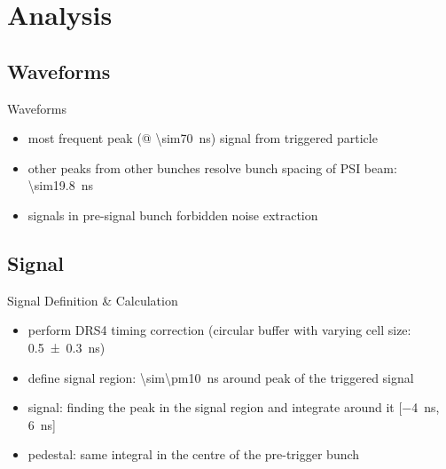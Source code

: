 \section{Analysis}
\subsection{Waveforms}
\begin{frame}{Waveforms}

	\vspace*{-20pt}
	\vspace*{-20pt}
	\vspace*{-10pt}

	\begin{itemize}\itemfill
		\item most frequent peak (@ \SI{\sim70}{ns}) \ra signal from triggered particle
		\item other peaks from other bunches \ra resolve bunch spacing of PSI beam: \SI{\sim19.8}{ns}
		\item signals in pre-signal bunch forbidden \ra noise extraction
	\end{itemize}
	
\end{frame}
\subsection{Signal}
\begin{frame}{Signal Definition \& Calculation}
 
	\vspace*{-10pt}
	
	\begin{itemize}\itemfill
		\item perform DRS4 timing correction (circular buffer with varying cell size: \SI{.5\pm.3}{\nano\second})
		\item define signal region: \SI{\sim\pm10}{\nano\second} around peak of the triggered signal 
		\item signal: finding the peak in the signal region and integrate around it [\SI{-4}{\nano\second}, \SI{6}{\nano\second}]
		\item pedestal: same integral in the centre of the pre-trigger bunch 
	\end{itemize}
 
\end{frame}
